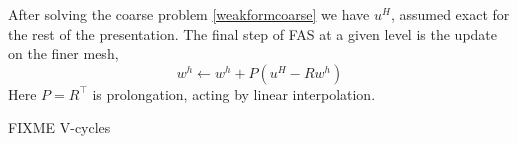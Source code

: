 \documentclass[letterpaper,final,12pt,reqno]{amsart}
\begin{document}
After solving the coarse problem \eqref{weakformcoarse} we have $u^H$, assumed exact for the rest of the presentation.  The final step of FAS at a given level is the update on the finer mesh,
\begin{equation}
  w^h \longleftarrow w^h + P(u^H - R w^h) \label{fasupdate}
\end{equation}
Here $P=R^\top$ is prolongation, acting by linear interpolation.

FIXME V-cycles

\small

\bigskip


\end{document}
